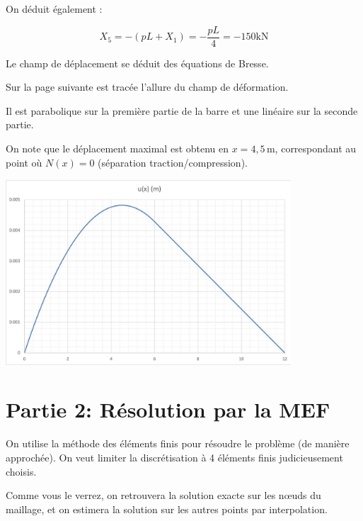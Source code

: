 \documentclass[11pt,a4paper]{report}
\begin{document}
\begin{enumerate}
{\begin{mdframed}
      On déduit également :

      $$
      X_{5}=-(p L+X_{1})=-\frac{p L}{4}=-150 \mathrm{kN}
      $$
    \end{mdframed}
  }{
  }
  \vspace{1em}

      Le champ de déplacement se déduit des équations de Bresse.\newline 

      Sur la page suivante est tracée l'allure du champ de déformation. 
      
      Il est parabolique sur la première partie de la barre et une linéaire sur la seconde partie. 
      
      On note que le déplacement maximal est obtenu en $x=4{,}5\,\mathrm{m}$, correspondant au point où $N(x)=0$ (séparation traction/compression).
      
      \enlargethispage{2\baselineskip}

      \begin{center}
      \includegraphics[width=0.8\textwidth]{2025_10_03_26e11264345fd9bad5cag-5}
      \end{center}
  
\end{enumerate}

\section*{Partie 2: Résolution par la MEF}
On utilise la méthode des éléments finis pour résoudre le problème (de manière approchée). On veut limiter la discrétisation à 4 éléments finis judicieusement choisis.

Comme vous le verrez, on retrouvera la solution exacte sur les nœuds du maillage, et on estimera la solution sur les autres points par interpolation.
\end{document}
